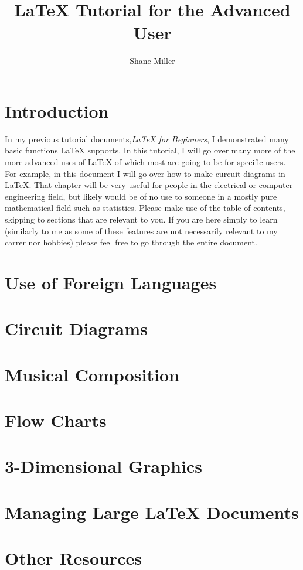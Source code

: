 \documentclass{article}
\title{\LaTeX{} Tutorial for the Advanced User}
\author{Shane Miller}
\begin{document}
	\maketitle
	\newpage


	\tableofcontents
	\newpage

	\section{Introduction}
	In my previous tutorial documents,\textit{\LaTeX{} for Beginners}, I demonstrated many basic functions \LaTeX{} supports. In this tutorial, I will go over many more of the more advanced uses of \LaTeX{} of which most are going to be for specific users. For example, in this document I will go over how to make curcuit diagrams in \LaTeX{}. That chapter will be very useful for people in the electrical or computer engineering field, but likely would be of no use to someone in a mostly pure mathematical field such as statistics. Please make use of the table of contents, skipping to sections that are relevant to you. If you are here simply to learn (similarly to me as some of these features are not necessarily relevant to my carrer nor hobbies) please feel free to go through the entire document.

	\section{Use of Foreign Languages}
	

	\section{Circuit Diagrams}

	
	\section{Musical Composition}

	
	\section{Flow Charts}


	\section{3-Dimensional Graphics}


	\section{Managing Large \LaTeX{} Documents}


	\section{Other Resources}
	
\end{document}
